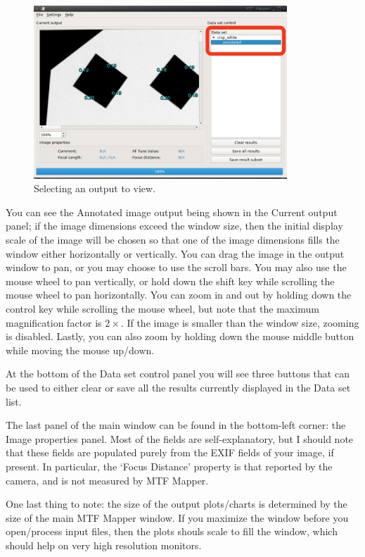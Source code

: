 \documentclass[a4paper]{article}
\begin{document}
\begin{figure}[bt!]
\centering
\includegraphics[width=0.85\textwidth]{figures/open_example2}
\caption{Selecting an output to view.}
\label{fig:open_example2}
\end{figure}

You can see the \textsf{Annotated} image output being shown in
the \textsf{Current output} panel; if the image dimensions exceed the window
size, then the initial display scale of the image
will be chosen so that one of the image dimensions fills the window
either horizontally or vertically.
You can drag the image in the output window to pan, or you may choose to use the scroll bars.
You may also use the mouse wheel to pan vertically, or hold down the shift
key while scrolling the mouse wheel to pan horizontally. You can zoom
in and out by holding down the control key while scrolling the mouse wheel,
but note that the maximum magnification factor is $2\times$. If the image is
smaller than the window size, zooming is disabled. Lastly, you can also zoom by
holding down the mouse middle button while moving the mouse up/down.


At the bottom of the \textsf{Data set control} panel you will see three
buttons that can be used to either clear or save all the results currently
displayed in the \textsf{Data set} list.

The last panel of the main window can be found in the bottom-left corner:
the \textsf{Image properties} panel. Most of the fields are
self-explanatory, but I should note that these fields are populated purely
from the EXIF fields of your image, if present. In particular, the `Focus
Distance' property is that reported by the camera, and is not measured by
MTF Mapper.

One last thing to note: the size of the output plots/charts is determined by
the size of the main MTF Mapper window. If you maximize the window before
you open/process input files, then the plots shouls scale to fill the
window, which should help on very high resolution monitors.
\end{document}
